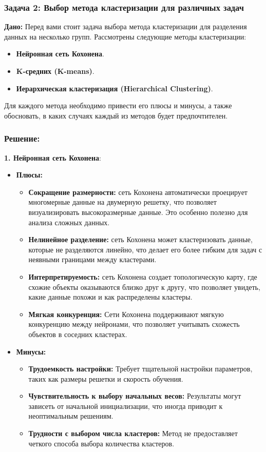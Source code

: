 \begin{itemize}
\subsubsection{Задача 2: Выбор метода кластеризации для различных задач}

\textbf{Дано:}
Перед вами стоит задача выбора метода кластеризации для разделения данных на несколько групп. Рассмотрены следующие методы кластеризации:
\begin{itemize}
    \item \textbf{Нейронная сеть Кохонена}.
    \item \textbf{K-средних (K-means)}.
    \item \textbf{Иерархическая кластеризация (Hierarchical Clustering)}.
\end{itemize}

Для каждого метода необходимо привести его плюсы и минусы, а также обосновать, в каких случаях каждый из методов будет предпочтителен.

\subsubsection{Решение:}

\textbf{1. Нейронная сеть Кохонена}:
\begin{itemize}
    \item \textbf{Плюсы:}
    \begin{itemize}
        \item \textbf{Сокращение размерности:} сеть Кохонена автоматически проецирует многомерные данные на двумерную решетку, что позволяет визуализировать высокоразмерные данные. Это особенно полезно для анализа сложных данных.
        \item \textbf{Нелинейное разделение:} сеть Кохонена может кластеризовать данные, которые не разделяются линейно, что делает его более гибким для задач с неявными границами между кластерами.
        \item \textbf{Интерпретируемость:} сеть Кохонена создает топологическую карту, где схожие объекты оказываются близко друг к другу, что позволяет увидеть, какие данные похожи и как распределены кластеры.
        \item \textbf{Мягкая конкуренция:} Сети Кохонена поддерживают мягкую конкуренцию между нейронами, что позволяет учитывать схожесть объектов в соседних кластерах.
    \end{itemize}
    \item \textbf{Минусы:}
    \begin{itemize}
        \item \textbf{Трудоемкость настройки:} Требует тщательной настройки параметров, таких как размеры решетки и скорость обучения.
        \item \textbf{Чувствительность к выбору начальных весов:} Результаты могут зависеть от начальной инициализации, что иногда приводит к неоптимальным решениям.
        \item \textbf{Трудности с выбором числа кластеров:} Метод не предоставляет четкого способа выбора количества кластеров.
    \end{itemize}
\end{itemize}


\end{itemize}
